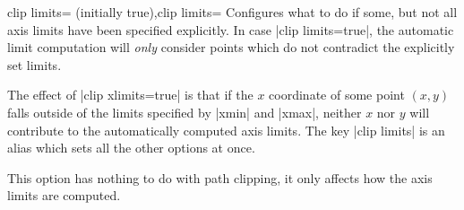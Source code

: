 \begin{pgfplotsxykeylist}{clip \x limits= (initially true),clip limits=}
    Configures what to do if some, but not all axis limits have been specified
    explicitly. In case |clip limits=true|, the automatic limit computation
    will \emph{only} consider points which do not contradict the explicitly set
    limits.

	The effect of |clip xlimits=true| is that if the $x$ coordinate of some point $(x,y)$ falls outside of the limits specified by |xmin| and |xmax|, neither $x$ nor $y$ will contribute to the automatically computed axis limits. The key |clip limits| is an alias which sets all the other options at once.

    This option has nothing to do with path clipping, it only affects how the
    axis limits are computed.
\end{pgfplotsxykeylist}

